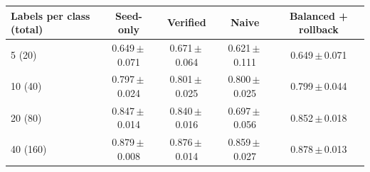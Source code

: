 \begin{tabular}{lcccc}
\toprule
Labels per class (total) & Seed-only & Verified & Naive & Balanced + rollback \\
\midrule
5 (20) & 0.649\,$\pm$\,0.071 & 0.671\,$\pm$\,0.064 & 0.621\,$\pm$\,0.111 & 0.649\,$\pm$\,0.071 \\
10 (40) & 0.797\,$\pm$\,0.024 & 0.801\,$\pm$\,0.025 & 0.800\,$\pm$\,0.025 & 0.799\,$\pm$\,0.044 \\
20 (80) & 0.847\,$\pm$\,0.014 & 0.840\,$\pm$\,0.016 & 0.697\,$\pm$\,0.056 & 0.852\,$\pm$\,0.018 \\
40 (160) & 0.879\,$\pm$\,0.008 & 0.876\,$\pm$\,0.014 & 0.859\,$\pm$\,0.027 & 0.878\,$\pm$\,0.013 \\
\bottomrule
\end{tabular}
